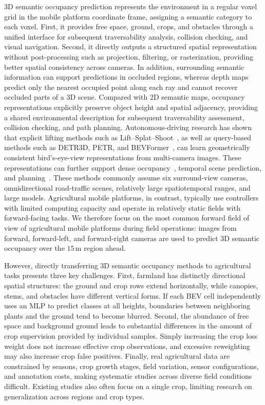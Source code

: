 \documentclass[a4paper,fleqn]{cas-sc}
\begin{document}
3D semantic occupancy prediction represents the environment in a regular voxel grid in the mobile platform coordinate frame, assigning a semantic category to each voxel.
First, it provides free space, ground, crops, and obstacles through a unified interface for subsequent traversability analysis, collision checking, and visual navigation.
Second, it directly outputs a structured spatial representation without post-processing such as projection, filtering, or rasterization, providing better spatial consistency across cameras.
In addition, surrounding semantic information can support predictions in occluded regions, whereas depth maps predict only the nearest occupied point along each ray and cannot recover occluded parts of a 3D scene.
Compared with 2D semantic maps, occupancy representations explicitly preserve object height and spatial adjacency, providing a shared environmental description for subsequent traversability assessment, collision checking, and path planning.
Autonomous-driving research has shown that explicit lifting methods such as Lift--Splat--Shoot~\citep{philion2020lift,huang2021bevdet,li2022bevdepth}, as well as query-based methods such as DETR3D, PETR, and BEVFormer~\citep{wang2022detr3d,li2022petr,li2022bevformer}, can learn geometrically consistent bird's-eye-view representations from multi-camera images. These representations can further support dense occupancy~\citep{wei2023surroundocc,wang2023openoccupancy}, temporal scene prediction, and planning~\citep{zheng2024occworld,mei2025irwm}.
These methods commonly assume six surround-view cameras, omnidirectional road-traffic scenes, relatively large spatiotemporal ranges, and large models. Agricultural mobile platforms, in contrast, typically use controllers with limited computing capacity and operate in relatively static fields with forward-facing tasks.
We therefore focus on the most common forward field of view of agricultural mobile platforms during field operations: images from forward, forward-left, and forward-right cameras are used to predict 3D semantic occupancy over the $15\,$m region ahead.

However, directly transferring 3D semantic occupancy methods to agricultural tasks presents three key challenges.
First, farmland has distinctly directional spatial structures: the ground and crop rows extend horizontally, while canopies, stems, and obstacles have different vertical forms. If each BEV cell independently uses an MLP to predict classes at all heights, boundaries between neighboring plants and the ground tend to become blurred.
Second, the abundance of free space and background ground leads to substantial differences in the amount of crop supervision provided by individual samples. Simply increasing the crop loss weight does not increase effective crop observations, and excessive reweighting may also increase crop false positives.
Finally, real agricultural data are constrained by seasons, crop growth stages, field variation, sensor configurations, and annotation costs, making systematic studies across diverse field conditions difficult. Existing studies also often focus on a single crop, limiting research on generalization across regions and crop types.
\end{document}
